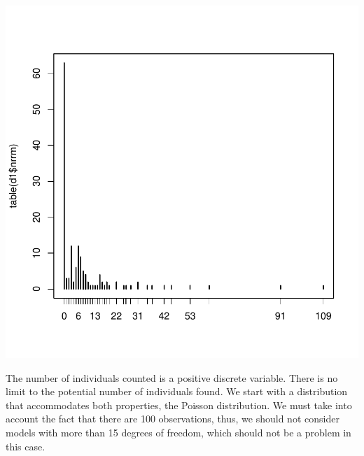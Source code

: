 \documentclass{article}
\begin{document}
\begin{Schunk}
\end{Schunk}
\includegraphics{HW08ZIPlogistic-004}

The number of individuals counted is a positive discrete variable. There is no limit to the potential number of individuals found. We start with a distribution that accommodates both properties, the Poisson distribution. We must take into account the fact that there are 100 observations, thus, we should not consider models with more than 15 degrees of freedom, which should not be a problem in this case.
\end{document}
